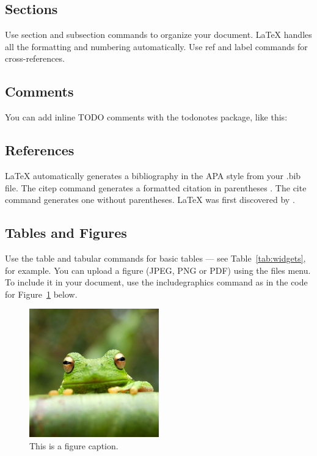 \documentclass[a4paper,man,natbib]{apa6}
\begin{document}
\subsection{Sections}

Use section and subsection commands to organize your document. \LaTeX{} handles all the formatting and numbering automatically. Use ref and label commands for cross-references.

\subsection{Comments}

You can add inline TODO comments with the todonotes package, like this:

\subsection{References}

LaTeX automatically generates a bibliography in the APA style from your .bib file. The citep command generates a formatted citation in parentheses \citep{Lamport1986}. The cite command generates one without parentheses. LaTeX was first discovered by \cite{Lamport1986}.

\subsection{Tables and Figures}

Use the table and tabular commands for basic tables --- see Table~\ref{tab:widgets}, for example. You can upload a figure (JPEG, PNG or PDF) using the files menu. To include it in your document, use the includegraphics command as in the code for Figure~\ref{fig:frog} below.

\begin{figure}
\centering
\includegraphics[width=0.5\textwidth]{frog.jpg}
\caption{\label{fig:frog}This is a figure caption.}
\end{figure}
\end{document}
